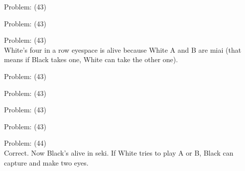 \documentclass[11pt]{article}
\begin{document}
\begin{minipage}[t]{0.5\textwidth}
  {\centering
  
Problem: (43)\\
  }
\end{minipage}
\begin{minipage}[t]{0.5\textwidth}
  {\centering
  
Problem: (43)\\
  }
\end{minipage}
\begin{minipage}[t]{0.5\textwidth}
  {\centering
  
Problem: (43)\\
White's four in a row eyespace is alive because White A and B are miai (that means if Black takes one, White can take the other one).\\
  }
\end{minipage}
\begin{minipage}[t]{0.5\textwidth}
  {\centering
  
Problem: (43)\\
  }
\end{minipage}
\begin{minipage}[t]{0.5\textwidth}
  {\centering
  
Problem: (43)\\
  }
\end{minipage}
\begin{minipage}[t]{0.5\textwidth}
  {\centering
  
Problem: (43)\\
  }
\end{minipage}
\begin{minipage}[t]{0.5\textwidth}
  {\centering
  
Problem: (43)\\
  }
\end{minipage}
\begin{minipage}[t]{0.5\textwidth}
  {\centering
  
Problem: (44)\\
Correct. Now Black's alive in seki. If White tries to play A or B, Black can capture and make two eyes.\\
  }
\end{minipage}
\end{document}
